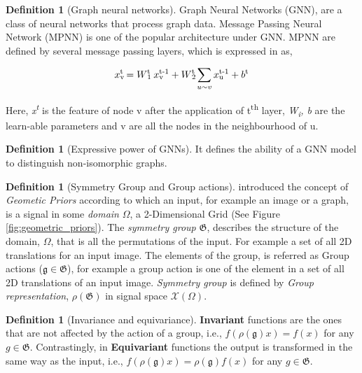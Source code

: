 \documentclass[11pt, dvipsnames, DIV=12]{scrreprt}
\theoremstyle{definition}
\newtheorem{definition}[theorem]{Definition}
\begin{document}
\begin{definition}[Graph neural networks]
\label{def:gnn} 
Graph Neural Networks (GNN), are a class of neural networks that process graph data. Message Passing Neural Network (MPNN) \citep{gilmer_mpnn_2017} is one of the popular architecture under GNN. MPNN are defined by several message passing layers, which is expressed in \citep{christopher_higher_order_gnn_2019} as,\begin{center}
    \emph{ \[ x\rlap{\textsubscript{v}}\textsuperscript{t} = W\rlap{\textsubscript{1}}\textsuperscript{t}\hspace{1mm}x\rlap{\textsubscript{v}}\textsuperscript{t-1} + W\rlap{\textsubscript{2}}\textsuperscript{t}  \sum_{u\sim v} x\rlap{\textsubscript{u}}\textsuperscript{t-1}+b\textsuperscript{t} \]}
\end{center}
Here, \emph{x\textsuperscript{t}} is the feature of node v after the application of t\textsuperscript{th} layer, \emph{W\textsubscript{i}, b} are the learn-able parameters and v are all the nodes in the neighbourhood of u. 
\end{definition}
\begin{definition}[Expressive power of GNNs] \label{def:expressive_gnn} 
It defines the ability of a GNN model to distinguish non-isomorphic graphs.
\end{definition}
\begin{definition}[Symmetry Group and Group actions]
\label{def:symm_gp_actions}
\cite{GeometricDL_Bronstein_2021} introduced the concept of \textit{Geometic Priors} according to which an input, for example an image or a graph, is a signal in some \emph{domain} $\Omega$, a 2-Dimensional Grid (See Figure \ref{fig:geometric_priors}). The \emph{symmetry group} $\mathfrak{G}$, describes the structure of the domain, $\Omega$, that is all the permutations of the input. For example a set of all 2D translations for an input image. The elements of the group, is referred as Group actions (\emph{$\mathfrak{g}\in\mathfrak{G}$}), for example a group action is one of the element in a set of all 2D translations of an input image. \emph{Symmetry group} is defined by \emph{Group representation}, $\rho(\mathfrak{G})$ in signal space $\mathcal{X}(\Omega)$.
\end{definition}
\begin{definition}[Invariance and equivariance] \label{def:inv_equiv} 
\textbf{Invariant} functions are the ones that are not affected by the action of a group, i.e.,
$f(\rho(\mathfrak{g})x)=f(x)$ for any $g\in\mathfrak{G}$. Contrastingly, in \textbf{Equivariant} functions the output is transformed in the same way as the input, i.e., $f(\rho(\mathfrak{g})x)=\rho(\mathfrak{g})f(x)$ for any $g\in\mathfrak{G}$.
\end{definition}
\end{document}
